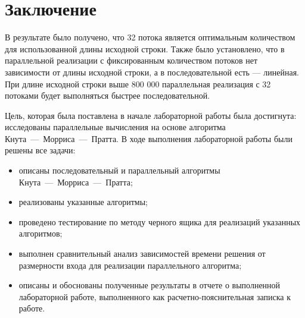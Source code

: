 \chapter*{Заключение}

В результате было получено, что 32 потока является оптимальным количеством для использованной длины исходной строки. Также было установлено, что в параллельной реализации с фиксированным количеством потоков нет зависимости от длины исходной строки, а в последовательной есть --- линейная. При длине исходной строки выше 800 000 параллельная реализация с 32 потоками будет выполняться быстрее последовательной.

Цель, которая была поставлена в начале лабораторной работы была достигнута: исследованы параллельные вычисления на основе алгоритма Кнута~---~Морриса~---~Пратта. В ходе выполнения лабораторной работы были решены все задачи:
\begin{itemize}[label=---]
	\item описаны последовательный и параллельный алгоритмы Кнута~---~Морриса~---~Пратта;
	\item реализованы указанные алгоритмы;
	\item проведено тестирование по методу черного ящика для реализаций указанных алгоритмов;
	\item выполнен сравнительный анализ зависимостей времени решения от размерности входа для реализации параллельного алгоритма;	
	\item описаны и обоснованы полученные результаты в отчете о выполненной лабораторной работе, выполненного как расчетно-пояснительная записка к работе.
\end{itemize}